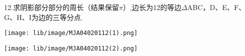 12.求阴影部分部分的周长（结果保留$\pi$）,边长为12的等边$\Delta$ABC，D、E、F、G、H、I为边的三等分点.

\begin{center}

    \texttt{[image: lib/image/MJA04020112(1).png]}\qquad\qquad\qquad

    \texttt{[image: lib/image/MJA04020112(2).png]}

\end{center}



